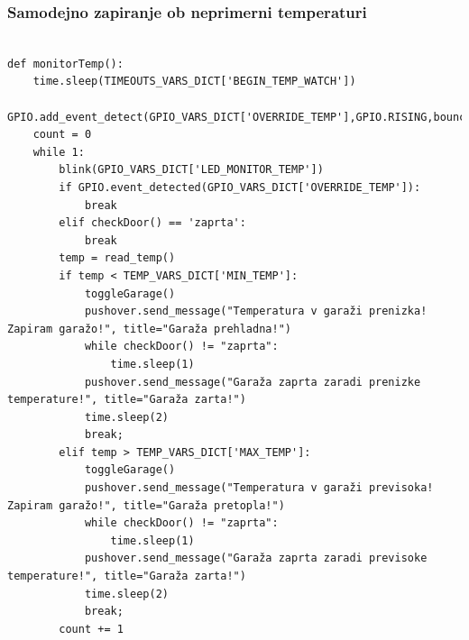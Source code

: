 \documentclass[11pt]{article}
\begin{document}
\subsubsection{Samodejno zapiranje ob neprimerni temperaturi}
\begin{verbatim}
  
def monitorTemp():
    time.sleep(TIMEOUTS_VARS_DICT['BEGIN_TEMP_WATCH'])
    GPIO.add_event_detect(GPIO_VARS_DICT['OVERRIDE_TEMP'],GPIO.RISING,bouncetime=300)
    count = 0
    while 1:
        blink(GPIO_VARS_DICT['LED_MONITOR_TEMP'])
        if GPIO.event_detected(GPIO_VARS_DICT['OVERRIDE_TEMP']):
            break
        elif checkDoor() == 'zaprta':
            break
        temp = read_temp()
        if temp < TEMP_VARS_DICT['MIN_TEMP']:
            toggleGarage()
            pushover.send_message("Temperatura v garaži prenizka! Zapiram garažo!", title="Garaža prehladna!")
            while checkDoor() != "zaprta":
                time.sleep(1)
            pushover.send_message("Garaža zaprta zaradi prenizke temperature!", title="Garaža zarta!")
            time.sleep(2)
            break;
        elif temp > TEMP_VARS_DICT['MAX_TEMP']:
            toggleGarage()
            pushover.send_message("Temperatura v garaži previsoka! Zapiram garažo!", title="Garaža pretopla!")
            while checkDoor() != "zaprta":
                time.sleep(1)
            pushover.send_message("Garaža zaprta zaradi previsoke temperature!", title="Garaža zarta!")
            time.sleep(2)
            break;
        count += 1
\end{verbatim}
\end{document}
